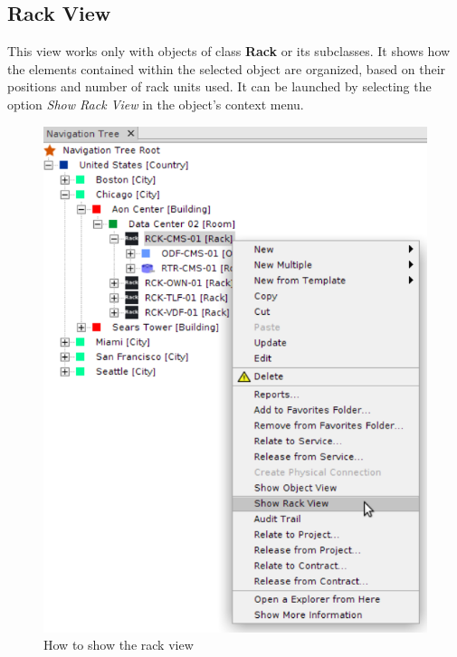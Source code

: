 \documentclass[a4paper]{article}
\begin{document}
		\clearpage
		\subsection{Rack View} \label{sec:rack_view}
		This view works only with objects of class \textbf{Rack} or its subclasses. It shows how the elements contained within the selected object are organized, based on their positions and number of rack units used. It can be launched by selecting the option \textit{Show Rack View} in the object's context menu.
		\begin{figure}[h!]
			\centering
			\includegraphics[width=0.5\linewidth]{img/show_rack_view.png}
			\caption{How to show the rack view}
			\label{fig:rack_view_combobox}
		\end{figure}
		
\end{document}
